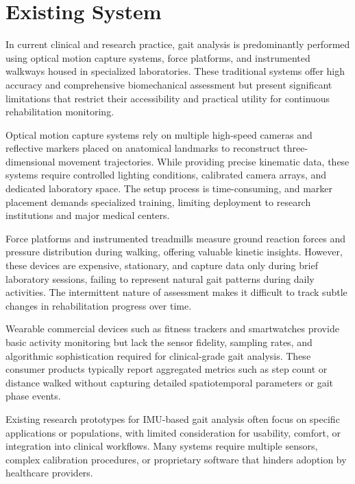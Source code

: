 \documentclass[12pt,a4paper]{report}
\begin{document}
\clearpage
{}
\setcounter{section}{0}
\section{Existing System}
In current clinical and research practice, gait analysis is predominantly performed using optical motion capture systems, force platforms, and instrumented walkways housed in specialized laboratories. These traditional systems offer high accuracy and comprehensive biomechanical assessment but present significant limitations that restrict their accessibility and practical utility for continuous rehabilitation monitoring.

Optical motion capture systems rely on multiple high-speed cameras and reflective markers placed on anatomical landmarks to reconstruct three-dimensional movement trajectories. While providing precise kinematic data, these systems require controlled lighting conditions, calibrated camera arrays, and dedicated laboratory space. The setup process is time-consuming, and marker placement demands specialized training, limiting deployment to research institutions and major medical centers.

Force platforms and instrumented treadmills measure ground reaction forces and pressure distribution during walking, offering valuable kinetic insights. However, these devices are expensive, stationary, and capture data only during brief laboratory sessions, failing to represent natural gait patterns during daily activities. The intermittent nature of assessment makes it difficult to track subtle changes in rehabilitation progress over time.

Wearable commercial devices such as fitness trackers and smartwatches provide basic activity monitoring but lack the sensor fidelity, sampling rates, and algorithmic sophistication required for clinical-grade gait analysis. These consumer products typically report aggregated metrics such as step count or distance walked without capturing detailed spatiotemporal parameters or gait phase events.

Existing research prototypes for IMU-based gait analysis often focus on specific applications or populations, with limited consideration for usability, comfort, or integration into clinical workflows. Many systems require multiple sensors, complex calibration procedures, or proprietary software that hinders adoption by healthcare providers.
\end{document}
